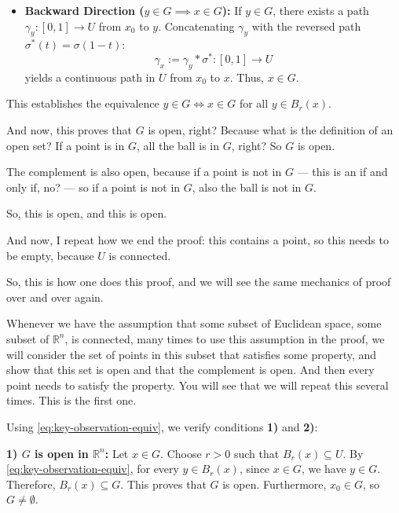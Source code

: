 \begin{proofWrapper}
\begin{content}
\begin{itemize}
    \item \textbf{Backward Direction ($y \in G \implies x \in G$):}
    If $y \in G$, there exists a path $\gamma_y \colon [0, 1] \to U$ from $x_0$ to $y$. Concatenating $\gamma_y$ with the reversed path $\sigma^*(t) = \sigma(1 - t)$:
    \[
    \gamma_x := \gamma_y * \sigma^* \colon [0, 1] \to U
    \]
    yields a continuous path in $U$ from $x_0$ to $x$. Thus, $x \in G$.
\end{itemize}
This establishes the equivalence $y \in G \iff x \in G$ for all $y \in B_r(x)$.
\end{content}

\begin{speech}[01:10:27 - 01:11:57]
And now, this proves that $G$ is open, right? Because what is the definition of an open set? If a point is in $G$, all the ball is in $G$, right? So $G$ is open.

The complement is also open, because if a point is not in $G$ --- this is an if and only if, no? --- so if a point is not in $G$, also the ball is not in $G$.

So, this is open, and this is open.

And now, I repeat how we end the proof: this contains a point, so this needs to be empty, because $U$ is connected.

So, this is how one does this proof, and we will see the same mechanics of proof over and over again.

Whenever we have the assumption that some subset of Euclidean space, some subset of $\mathbb{R}^n$, is connected, many times to use this assumption in the proof, we will consider the set of points in this subset that satisfies some property, and show that this set is open and that the complement is open. And then every point needs to satisfy the property. You will see that we will repeat this several times. This is the first one.
\end{speech}

\begin{content}
Using \eqref{eq:key-observation-equiv}, we verify conditions \textbf{1)} and \textbf{2)}:

\textbf{1) $G$ is open in $\mathbb{R}^n$:}
Let $x \in G$. Choose $r > 0$ such that $B_r(x) \subseteq U$. By \eqref{eq:key-observation-equiv}, for every $y \in B_r(x)$, since $x \in G$, we have $y \in G$. Therefore, $B_r(x) \subseteq G$. This proves that $G$ is open. Furthermore, $x_0 \in G$, so $G \neq \emptyset$.


\end{content}
\end{proofWrapper}
